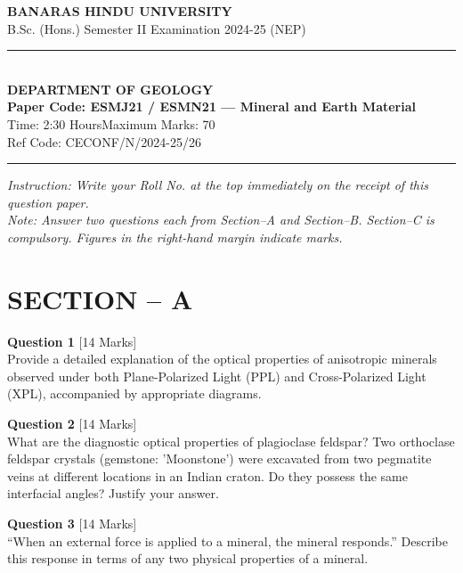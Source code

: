 \documentclass[11pt,a4paper]{article}
\begin{document}
\begin{center}
  {\large\bfseries BANARAS HINDU UNIVERSITY}\\[2pt]
  {\normalsize B.Sc. (Hons.) Semester II Examination 2024-25 (NEP)}\\[6pt]
  \rule{0.8\linewidth}{0.5pt}\\[6pt]
  {\large\bfseries DEPARTMENT OF GEOLOGY}\\[4pt]
  {\large\bfseries Paper Code: ESMJ21 / ESMN21 --- Mineral and Earth Material}\\[4pt]
  {\normalsize Time: 2:30 Hours\hfill Maximum Marks: 70}\\[2pt]
  {\small Ref Code: CECONF/N/2024-25/26}
\end{center}

\rule{\linewidth}{0.4pt}\smallskip



\noindent   \textit{Instruction: Write your Roll No. at the top immediately on the receipt of this question paper.}\\[2pt]



\noindent   \textit{Note: Answer two questions each from Section--A and Section--B. Section--C is compulsory. Figures in the right-hand margin indicate marks.}
\bigskip

\section*{SECTION -- A}




\noindent   \textbf{Question 1} \hfill [14 Marks]\\
Provide a detailed explanation of the optical properties of anisotropic minerals observed under both Plane-Polarized Light (PPL) and Cross-Polarized Light (XPL), accompanied by appropriate diagrams.

\bigskip




\noindent   \textbf{Question 2} \hfill [14 Marks]\\
What are the diagnostic optical properties of plagioclase feldspar? Two orthoclase feldspar crystals (gemstone: 'Moonstone') were excavated from two pegmatite veins at different locations in an Indian craton. Do they possess the same interfacial angles? Justify your answer.

\bigskip




\noindent   \textbf{Question 3} \hfill [14 Marks]\\
``When an external force is applied to a mineral, the mineral responds.'' Describe this response in terms of any two physical properties of a mineral.
\end{document}
